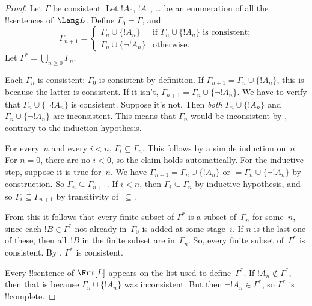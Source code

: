\documentclass[../../../include/open-logic-section]{subfiles}
\begin{document}
\begin{proof}
Let $\Gamma$ be consistent.  Let $!A_0$, $!A_1$,
\dots{} be an enumeration of all the !!{sentence}s of~$\Lang L$.
Define $\Gamma_0 = \Gamma$, and
\[
\Gamma_{n+1} =
\begin{cases}
\Gamma_n \cup \{ !A_n \} & \textrm{if $\Gamma_n \cup \{!A_n\}$ is
  consistent;} \\
\Gamma_n \cup \{ \lnot !A_n \} & \textrm{otherwise.}
\end{cases}
\]
Let $\Gamma^* = \bigcup_{n \geq 0} \Gamma_n$.

Each $\Gamma_n$ is consistent: $\Gamma_0$ is consistent by definition.
If $\Gamma_{n+1} = \Gamma_n \cup \{!A_n\}$, this is because the latter
is consistent.  If it isn't, $\Gamma_{n+1} = \Gamma_n \cup \{\lnot
!A_n\}$. We have to verify that $\Gamma_n \cup \{\lnot !A_n\}$ is
consistent. Suppose it's not. Then \emph{both} $\Gamma_n \cup
\{!A_n\}$ and $\Gamma_n \cup \{\lnot !A_n\}$ are inconsistent.  This
means that $\Gamma_n$ would be inconsistent by
,
contrary to the induction hypothesis.

For every~$n$ and every $i < n$, $\Gamma_i \subseteq \Gamma_n$. This
follows by a simple induction on~$n$. For $n=0$, there are no $i < 0$,
so the claim holds automatically.  For the inductive step, suppose it
is true for~$n$. We have $\Gamma_{n+1} = \Gamma_n \cup \{!A_n\}$ or $=
\Gamma_n \cup \{\lnot !A_n\}$ by construction. So $\Gamma_n \subseteq
\Gamma_{n+1}$. If $i < n$, then $\Gamma_i \subseteq \Gamma_n$ by
inductive hypothesis, and so $\Gamma_i \subseteq \Gamma_{n+1}$ by transitivity
of~$\subseteq$.

From this it follows that every finite subset of $\Gamma^*$ is a
subset of~$\Gamma_n$ for some~$n$, since each $!B \in \Gamma^*$ not
already in~$\Gamma_0$ is added at some stage~$i$. If $n$ is the last
one of these, then all~$!B$ in the finite subset are
in~$\Gamma_n$. So, every finite subset of~$\Gamma^*$ is consistent. By
, $\Gamma^*$ is
  consistent.

Every !!{sentence} of $\Frm[L]$ appears on the list used to
define~$\Gamma^*$. If $!A_n \notin \Gamma^*$, then that is because
$\Gamma_n \cup \{!A_n\}$ was inconsistent.  But then $\lnot !A_n
\in \Gamma^*$, so $\Gamma^*$ is !!{complete}.
\end{proof}
\end{document}

